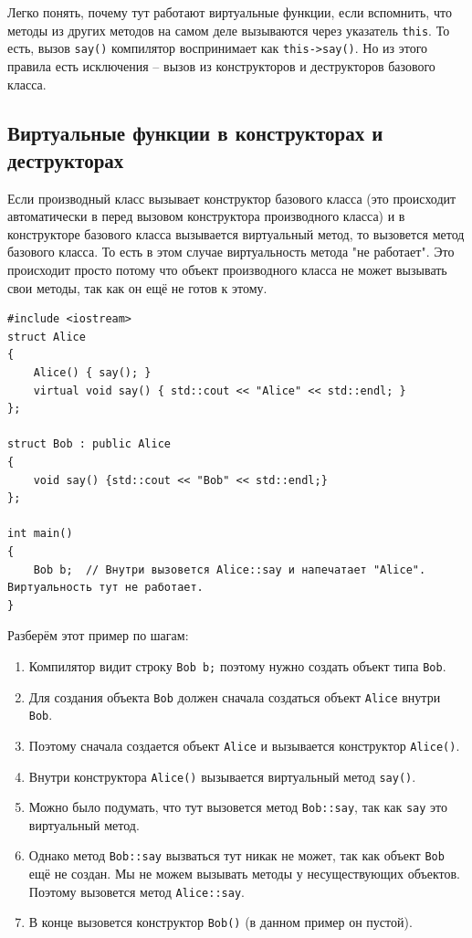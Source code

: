 \documentclass{article}
\begin{document}
Легко понять, почему тут работают виртуальные функции, если вспомнить, что методы из других методов на самом деле вызываются через указатель \texttt{this}. То есть, вызов \texttt{say()} компилятор воспринимает как \texttt{this->say()}. Но из этого правила есть исключения -- вызов из конструкторов и деструкторов базового класса.

\newpage
\subsection*{Виртуальные функции в конструкторах и деструкторах}
Если производный класс вызывает конструктор базового класса (это происходит автоматически в перед вызовом конструктора производного класса) и в конструкторе базового класса вызывается виртуальный метод, то вызовется метод базового класса. То есть в этом случае виртуальность метода "не работает".
Это происходит просто потому что объект производного класса не может вызывать свои методы, так как он ещё не готов к этому. 
\begin{lstlisting}[style=csMiptCppBorderStyle]
#include <iostream>
struct Alice 
{
    Alice() { say(); }
    virtual void say() { std::cout << "Alice" << std::endl; }
};

struct Bob : public Alice 
{
    void say() {std::cout << "Bob" << std::endl;}
};

int main() 
{
    Bob b;  // Внутри вызовется Alice::say и напечатает "Alice". Виртуальность тут не работает.
}
\end{lstlisting}
Разберём этот пример по шагам:
\begin{enumerate}
\item Компилятор видит строку \texttt{Bob b;} поэтому нужно создать объект типа \texttt{Bob}.
\item Для создания объекта \texttt{Bob} должен сначала создаться объект \texttt{Alice} внутри \texttt{Bob}.
\item Поэтому сначала создается объект \texttt{Alice} и вызывается конструктор \texttt{Alice()}.
\item Внутри конструктора \texttt{Alice()} вызывается виртуальный метод \texttt{say()}. 
\item Можно было подумать, что тут вызовется метод \texttt{Bob::say}, так как \texttt{say} это виртуальный метод.
\item Однако метод \texttt{Bob::say} вызваться тут никак не может, так как объект \texttt{Bob} ещё не создан. Мы не можем вызывать методы у несуществующих объектов. Поэтому вызовется метод \texttt{Alice::say}.
\item В конце вызовется конструктор \texttt{Bob()} (в данном пример он пустой).
\end{enumerate}
\end{document}
